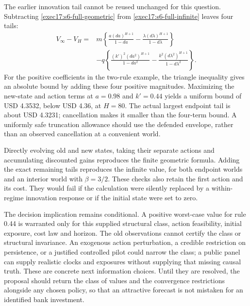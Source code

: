 The earlier innovation tail cannot be reused unchanged for this question.
Subtracting \eqref{exec17:s6-full-geometric} from
\eqref{exec17:s6-full-infinite} leaves four tails:
\begin{equation}
 \begin{split}
 V_\infty-V_H={}&m\left\{
 \frac{a(da)^{H+1}}{1-da}
 -\frac{\lambda(d\lambda)^{H+1}}{1-d\lambda}\right\}\\
 &-q\left\{\frac{(k')^2(da^2)^{H+1}}{1-da^2}
 -\frac{k^2(d\lambda^2)^{H+1}}{1-d\lambda^2}\right\}.
 \end{split}
 \label{exec17:s6-full-tail}
\end{equation}
For the positive coefficients in the two-rule example, the triangle
inequality gives an absolute bound by adding these four positive
magnitudes. Maximizing the new-state and action terms at $a=0.98$ and
$k'=0.44$ yields a uniform bound of USD 4.3532, below USD 4.36, at $H=80$.
The actual largest endpoint tail is about USD 4.3231; cancellation makes
it smaller than the four-term bound. A uniformly safe truncation allowance
should use the defended envelope, rather than an observed cancellation
at a convenient world.~\citep{exec17_s6_extension}

Directly evolving old and new states, taking their separate actions and
accumulating discounted gains reproduces the finite geometric formula.
Adding the exact remaining tails reproduces the infinite value, for both
endpoint worlds and an interior world with $\beta=3/2$. These checks also
retain the first action and its cost. They would fail if the calculation
were silently replaced by a within-regime innovation response or if the
initial state were set to zero.

The decision implication remains conditional. A positive worst-case value
for rule 0.44 is warranted only for this supplied structural class, action
feasibility, initial exposure, cost law and horizon. The old observations
cannot certify the class or structural invariance. An exogenous action
perturbation, a credible restriction on persistence, or a justified
controlled pilot could narrow the class; a public panel can supply
realistic clocks and exposures without supplying that missing causal
truth. These are concrete next information choices. Until they are
resolved, the proposal should return the class of values and the
convergence restrictions alongside any chosen policy, so that an
attractive forecast is not mistaken for an identified bank investment.
